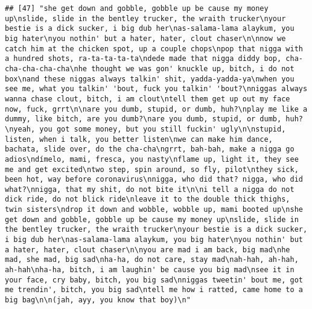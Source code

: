 \documentclass[]{article}
\begin{document}
\begin{verbatim}
## [47] "she get down and gobble, gobble up be cause my money up\nslide, slide in the bentley trucker, the wraith trucker\nyour bestie is a dick sucker, i big dub her\nas-salama-lama alaykum, you big hater\nyou nothin' but a hater, hater, clout chaser\n\nnow we catch him at the chicken spot, up a couple chops\npop that nigga with a hundred shots, ra-ta-ta-ta-ta\ndede made that nigga diddy bop, cha-cha-cha-cha-cha\nhe thought we was gon' knuckle up, bitch, i do not box\nand these niggas always talkin' shit, yadda-yadda-ya\nwhen you see me, what you talkin' 'bout, fuck you talkin' 'bout?\nniggas always wanna chase clout, bitch, i am clout\ntell them get up out my face now, fuck, grrt\n\nare you dumb, stupid, or dumb, huh?\nplay me like a dummy, like bitch, are you dumb?\nare you dumb, stupid, or dumb, huh?\nyeah, you got some money, but you still fuckin' ugly\n\nstupid, listen, when i talk, you better listen\nwe can make him dance, bachata, slide over, do the cha-cha\ngrrt, bah-bah, make a nigga go adios\ndímelo, mami, fresca, you nasty\nflame up, light it, they see me and get excited\ntwo step, spin around, so fly, pilot\nthey sick, been hot, way before coronavirus\nnigga, who did that? nigga, who did what?\nnigga, that my shit, do not bite it\n\ni tell a nigga do not dick ride, do not blick ride\nleave it to the double thick thighs, twin sisters\ndrop it down and wobble, wobble up, mami booted up\nshe get down and gobble, gobble up be cause my money up\nslide, slide in the bentley trucker, the wraith trucker\nyour bestie is a dick sucker, i big dub her\nas-salama-lama alaykum, you big hater\nyou nothin' but a hater, hater, clout chaser\n\nyou are mad i am back, big mad\nhe mad, she mad, big sad\nha-ha, do not care, stay mad\nah-hah, ah-hah, ah-hah\nha-ha, bitch, i am laughin' be cause you big mad\nsee it in your face, cry baby, bitch, you big sad\nniggas tweetin' bout me, got me trendin', bitch, you big sad\ntell me how i ratted, came home to a big bag\n\n(jah, ayy, you know that boy)\n"                                                                                                                                                                                                                                                                                                                                                                                                                                                                                                                                                                                                                                                                                                                                                                                                                                                                                                                                                                                                                                                                                                                                                                                                                                                                                                                                                 
\end{verbatim}
\end{document}
